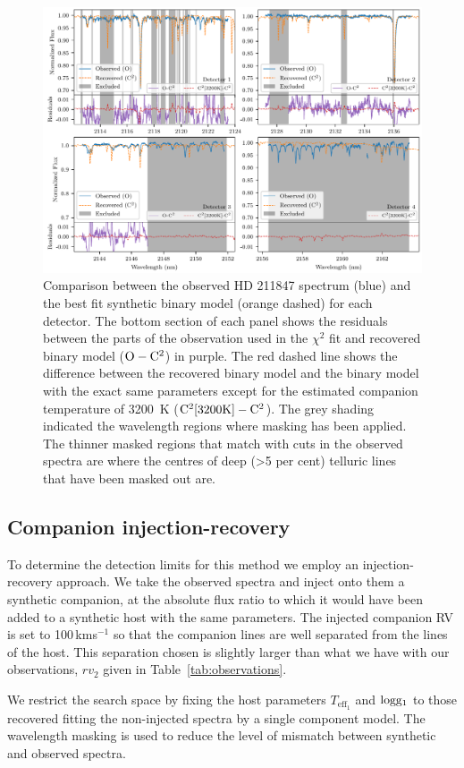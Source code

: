 \documentclass[fleqn,usenatbib]{mnras}
\newcommand{\kmps}{\,kms\(^{-1}\)}	%
\begin{document}
\begin{figure}
    \centering
    \includegraphics[width=0.8\hsize]{images/fig6.pdf}
    \caption{Comparison between the observed {HD 211847} spectrum (blue) and the best fit synthetic binary model (orange dashed) for each detector. The bottom section of each panel shows the residuals between the parts of the observation used in the \(\chi^2\) fit and recovered binary model (\(\rm O-C^2\)) in purple. The red dashed line shows the difference between the recovered binary model and the binary model with the exact same parameters except for the estimated companion temperature of 3200~K (\(\rm C^2[3200K]- C^2\)). The grey shading indicated the wavelength regions where masking has been applied. The thinner masked regions that match with cuts in the observed spectra are where the centres of deep (>5 per cent) telluric lines that have been masked out are.}
    \label{fig:visualinspection-hd2118471}
\end{figure}

\subsection{Companion injection-recovery}
\label{subsection:injection-recovery}
To determine the detection limits for this method we employ an injection-recovery approach. We take the observed spectra and inject onto them a synthetic companion, at the absolute flux ratio to which it would have been added to a synthetic host with the same parameters. The injected companion RV is set to 100\kmps{} so that the companion lines are well separated from the lines of the host. This separation chosen is slightly larger than what we have with our observations, \(rv_2\) given in Table~\ref{tab:observations}.

We restrict the search space by fixing the host parameters \(T_{\textrm{eff}_1}\) and \(\rm logg_1\) to those recovered fitting the non-injected spectra by a single component model. The wavelength masking is used to reduce the level of mismatch between synthetic and observed spectra.
\end{document}
